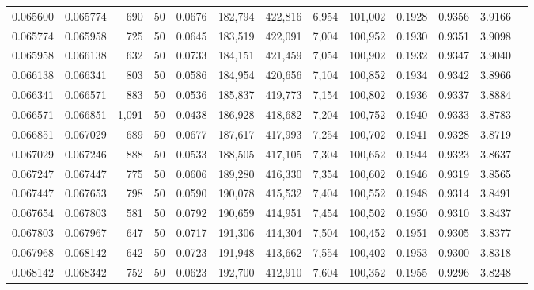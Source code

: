 \begin{tabular}{rrrrrrrrrrrrr}
0.065600 & 0.065774 &   690 &  50 &                                     0.0676 & 182,794 & 422,816 &   6,954 & 101,002 & 0.1928 & 0.9356 & 3.9166 \\
0.065774 & 0.065958 &   725 &  50 &                                     0.0645 & 183,519 & 422,091 &   7,004 & 100,952 & 0.1930 & 0.9351 & 3.9098 \\
0.065958 & 0.066138 &   632 &  50 &                                     0.0733 & 184,151 & 421,459 &   7,054 & 100,902 & 0.1932 & 0.9347 & 3.9040 \\
0.066138 & 0.066341 &   803 &  50 &                                     0.0586 & 184,954 & 420,656 &   7,104 & 100,852 & 0.1934 & 0.9342 & 3.8966 \\
0.066341 & 0.066571 &   883 &  50 &                                     0.0536 & 185,837 & 419,773 &   7,154 & 100,802 & 0.1936 & 0.9337 & 3.8884 \\
0.066571 & 0.066851 & 1,091 &  50 &                                     0.0438 & 186,928 & 418,682 &   7,204 & 100,752 & 0.1940 & 0.9333 & 3.8783 \\
0.066851 & 0.067029 &   689 &  50 &                                     0.0677 & 187,617 & 417,993 &   7,254 & 100,702 & 0.1941 & 0.9328 & 3.8719 \\
0.067029 & 0.067246 &   888 &  50 &                                     0.0533 & 188,505 & 417,105 &   7,304 & 100,652 & 0.1944 & 0.9323 & 3.8637 \\
0.067247 & 0.067447 &   775 &  50 &                                     0.0606 & 189,280 & 416,330 &   7,354 & 100,602 & 0.1946 & 0.9319 & 3.8565 \\
0.067447 & 0.067653 &   798 &  50 &                                     0.0590 & 190,078 & 415,532 &   7,404 & 100,552 & 0.1948 & 0.9314 & 3.8491 \\
0.067654 & 0.067803 &   581 &  50 &                                     0.0792 & 190,659 & 414,951 &   7,454 & 100,502 & 0.1950 & 0.9310 & 3.8437 \\
0.067803 & 0.067967 &   647 &  50 &                                     0.0717 & 191,306 & 414,304 &   7,504 & 100,452 & 0.1951 & 0.9305 & 3.8377 \\
0.067968 & 0.068142 &   642 &  50 &                                     0.0723 & 191,948 & 413,662 &   7,554 & 100,402 & 0.1953 & 0.9300 & 3.8318 \\
0.068142 & 0.068342 &   752 &  50 &                                     0.0623 & 192,700 & 412,910 &   7,604 & 100,352 & 0.1955 & 0.9296 & 3.8248 \\

\end{tabular}
